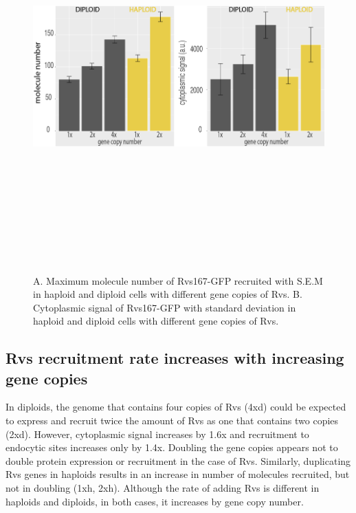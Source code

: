 	\begin{figure}[H]
	\centering
\includegraphics[width=13cm,height=15cm,keepaspectratio]{figures/discussion/number_comp2}
	\caption[Synaptojanin-like proteins in yeast]
	{A. Maximum molecule number of Rvs167-GFP recruited with S.E.M in haploid and diploid cells with different gene copies of Rvs. 
	B. Cytoplasmic signal of Rvs167-GFP with standard deviation in haploid and diploid cells with different gene copies of Rvs. 
	\label{concentration}}
	\end{figure}

\subsection{Rvs recruitment rate increases with increasing gene copies}
In diploids, the genome that contains four copies of Rvs (4xd) could be expected to express and recruit twice the amount of Rvs as one that contains two copies (2xd). However, cytoplasmic signal increases by 1.6x and recruitment to endocytic sites increases only by 1.4x. Doubling the gene copies appears not to double protein expression or recruitment in the case of Rvs. Similarly, duplicating Rvs genes in haploids results in an increase in number of molecules recruited, but not in doubling (1xh, 2xh). Although the rate of adding Rvs is different in haploids and diploids, in both cases, it increases by gene copy number. 

